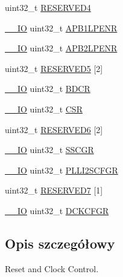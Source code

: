 \begin{DoxyCompactItemize}
\item 
uint32\+\_\+t \hyperlink{struct_r_c_c___type_def_a0f009e4bd1777ac1b86ca27e23361a0e}{R\+E\+S\+E\+R\+V\+E\+D4}
\item 
\hyperlink{core__sc300_8h_aec43007d9998a0a0e01faede4133d6be}{\+\_\+\+\_\+\+IO} uint32\+\_\+t \hyperlink{struct_r_c_c___type_def_a5c8e710c40b642dcbf296201a7ecb2da}{A\+P\+B1\+L\+P\+E\+NR}
\item 
\hyperlink{core__sc300_8h_aec43007d9998a0a0e01faede4133d6be}{\+\_\+\+\_\+\+IO} uint32\+\_\+t \hyperlink{struct_r_c_c___type_def_a7e46c65220f00a6858a5b35b74a37b51}{A\+P\+B2\+L\+P\+E\+NR}
\item 
uint32\+\_\+t \hyperlink{struct_r_c_c___type_def_af9159a971013ef0592be8be3e256a344}{R\+E\+S\+E\+R\+V\+E\+D5} \mbox{[}2\mbox{]}
\item 
\hyperlink{core__sc300_8h_aec43007d9998a0a0e01faede4133d6be}{\+\_\+\+\_\+\+IO} uint32\+\_\+t \hyperlink{struct_r_c_c___type_def_a05be375db50e8c9dd24fb3bcf42d7cf1}{B\+D\+CR}
\item 
\hyperlink{core__sc300_8h_aec43007d9998a0a0e01faede4133d6be}{\+\_\+\+\_\+\+IO} uint32\+\_\+t \hyperlink{struct_r_c_c___type_def_a7e913b8bf59d4351e1f3d19387bd05b9}{C\+SR}
\item 
uint32\+\_\+t \hyperlink{struct_r_c_c___type_def_a30cfd1a2f2eb931bacfd2be965e53d1b}{R\+E\+S\+E\+R\+V\+E\+D6} \mbox{[}2\mbox{]}
\item 
\hyperlink{core__sc300_8h_aec43007d9998a0a0e01faede4133d6be}{\+\_\+\+\_\+\+IO} uint32\+\_\+t \hyperlink{struct_r_c_c___type_def_a52270ad1423c68cd536f62657bb669f5}{S\+S\+C\+GR}
\item 
\hyperlink{core__sc300_8h_aec43007d9998a0a0e01faede4133d6be}{\+\_\+\+\_\+\+IO} uint32\+\_\+t \hyperlink{struct_r_c_c___type_def_ac3beb02dccd9131d6ce55bb29c5fa69f}{P\+L\+L\+I2\+S\+C\+F\+GR}
\item 
uint32\+\_\+t \hyperlink{struct_r_c_c___type_def_abcd04be226dcaaa5a329998927f54222}{R\+E\+S\+E\+R\+V\+E\+D7} \mbox{[}1\mbox{]}
\item 
\hyperlink{core__sc300_8h_aec43007d9998a0a0e01faede4133d6be}{\+\_\+\+\_\+\+IO} uint32\+\_\+t \hyperlink{struct_r_c_c___type_def_a877ad70fcd4a215bc8f9bb31fdc8d3d1}{D\+C\+K\+C\+F\+GR}
\end{DoxyCompactItemize}


\subsection{Opis szczegółowy}
Reset and Clock Control. 

